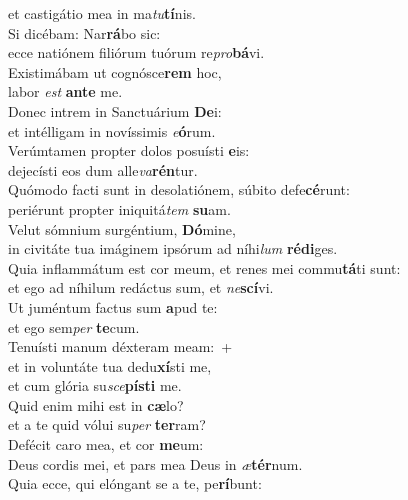 \evenverse et castigátio mea in ma\textit{tu}\textbf{tí}nis.\\
\oddverse Si dicébam: Nar\textbf{rá}bo sic:~\*\\
\oddverse ecce natiónem filiórum tuórum re\textit{pro}\textbf{bá}vi.\\
\evenverse Existimábam ut cognósce\textbf{rem} hoc,~\*\\
\evenverse labor \textit{est} \textbf{an}\textbf{te} me.\\
\oddverse Donec intrem in Sanctuárium \textbf{De}i:~\*\\
\oddverse et intélligam in novíssimis \textit{e}\textbf{ó}rum.\\
\evenverse Verúmtamen propter dolos posuísti \textbf{e}is:~\*\\
\evenverse dejecísti eos dum alle\textit{va}\textbf{rén}tur.\\
\oddverse Quómodo facti sunt in desolatiónem, súbito defe\textbf{cé}runt:~\*\\
\oddverse periérunt propter iniquitá\textit{tem} \textbf{su}am.\\
\evenverse Velut sómnium surgéntium, \textbf{Dó}mine,~\*\\
\evenverse in civitáte tua imáginem ipsórum ad níhi\textit{lum} \textbf{ré}\textbf{di}ges.\\
\oddverse Quia inflammátum est cor meum, et renes mei commu\textbf{tá}ti sunt:~\*\\
\oddverse et ego ad níhilum redáctus sum, et \textit{ne}\textbf{scí}vi.\\
\evenverse Ut juméntum factus sum \textbf{a}pud te:~\*\\
\evenverse et ego sem\textit{per} \textbf{te}cum.\\
\oddverse Tenuísti manum déxteram meam:~+\\
\oddverse  et in voluntáte tua dedu\textbf{xí}sti me,~\*\\
\oddverse et cum glória su\textit{sce}\textbf{pí}\textbf{sti} me.\\
\evenverse Quid enim mihi est in \textbf{cæ}lo?~\*\\
\evenverse et a te quid vólui su\textit{per} \textbf{ter}ram?\\
\oddverse Defécit caro mea, et cor \textbf{me}um:~\*\\
\oddverse Deus cordis mei, et pars mea Deus in \textit{æ}\textbf{tér}num.\\
\evenverse Quia ecce, qui elóngant se a te, pe\textbf{rí}bunt:~\*\\
